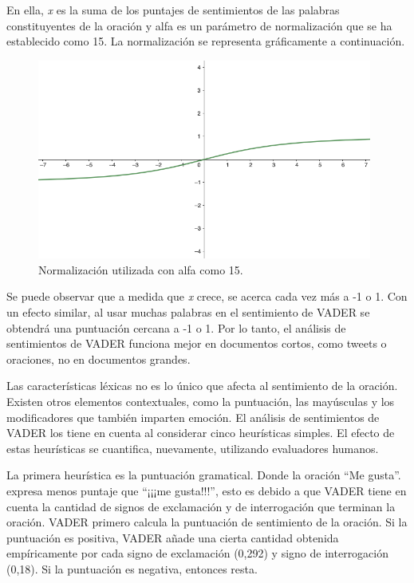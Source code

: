 \vspace{0.3cm}

En ella, \textit{x} es la suma de los puntajes de sentimientos de las palabras constituyentes de la oración y alfa es un parámetro de normalización que se ha establecido como 15. La normalización se representa gráficamente a continuación.

\begin{figure}[H]
    \centering
    \myfloatalign
    \includegraphics[width=0.98\textwidth]{gfx/grafica-normalizacion.png}
    \caption[Normalización utilizada con alfa como 15]{Normalización utilizada con alfa como 15.}\label{gfx:normalizacion}
\end{figure}

Se puede observar que a medida que \textit{x} crece, se acerca cada vez más a -1 o 1. Con un efecto similar, al usar muchas palabras en el sentimiento de \ac{VADER} se obtendrá una puntuación cercana a -1 o 1. Por lo tanto, el análisis de sentimientos de VADER funciona mejor en documentos cortos, como tweets o oraciones, no en documentos grandes.

\vspace{0.3cm}

Las características léxicas no es lo único que afecta al sentimiento de la oración. Existen otros elementos contextuales, como la puntuación, las mayúsculas y los modificadores que también imparten emoción. El análisis de sentimientos de \ac{VADER} los tiene en cuenta al considerar cinco heurísticas simples. El efecto de estas heurísticas se cuantifica, nuevamente, utilizando evaluadores humanos.

\vspace{0.3cm}

La primera heurística es la puntuación gramatical. Donde la oración \enquote{Me gusta}. expresa menos puntaje que \enquote{¡¡¡me gusta!!!}, esto es debido a que \ac{VADER} tiene en cuenta la cantidad de signos de exclamación y de interrogación que terminan la oración. \ac{VADER} primero calcula la puntuación de sentimiento de la oración. Si la puntuación es positiva, \ac{VADER} añade una cierta cantidad obtenida empíricamente por cada signo de exclamación (0,292) y signo de interrogación (0,18). Si la puntuación es negativa, entonces resta.

